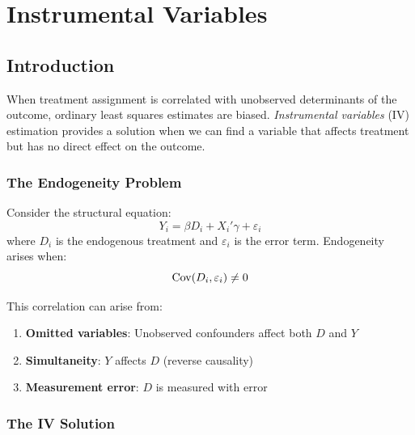 
\chapter{Instrumental Variables}
\label{ch:iv}

\section{Introduction}
\label{sec:iv_intro}

When treatment assignment is correlated with unobserved determinants of the outcome, ordinary least squares estimates are biased. \emph{Instrumental variables} (IV) estimation provides a solution when we can find a variable that affects treatment but has no direct effect on the outcome.

\subsection{The Endogeneity Problem}

Consider the structural equation:
\begin{equation}
Y_i = \beta D_i + X_i'\gamma + \varepsilon_i
\label{eq:structural}
\end{equation}
where $D_i$ is the endogenous treatment and $\varepsilon_i$ is the error term. Endogeneity arises when:
\begin{equation}
\mathrm{Cov}(D_i, \varepsilon_i) \neq 0
\end{equation}

This correlation can arise from:
\begin{enumerate}
    \item \textbf{Omitted variables}: Unobserved confounders affect both $D$ and $Y$
    \item \textbf{Simultaneity}: $Y$ affects $D$ (reverse causality)
    \item \textbf{Measurement error}: $D$ is measured with error
\end{enumerate}

\subsection{The IV Solution}

